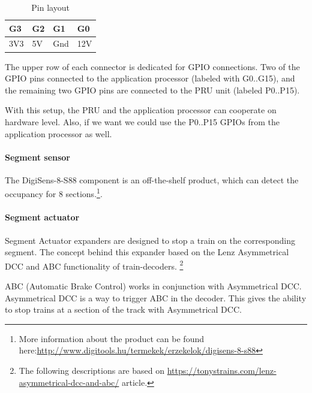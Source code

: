 \begin{table}
	\caption{Pin layout}
	\label{table:expander_pin_layout}
	\begin{center}
		\renewcommand{\arraystretch}{1.8}
		\begin{tabu} to 0.3\textwidth { | X[c] | X[c] | X[c] | X[c] |}
			\hline
			G3 & G2 & G1 & G0 \\
			\hline
			3V3  & 5V  & Gnd  & 12V\\
			\hline
		\end{tabu}
	\end{center}
\end{table} 

The upper row of each connector is dedicated for GPIO connections. Two of the GPIO pins connected to the application processor (labeled with G0..G15), and the remaining two GPIO pins are connected to the PRU unit (labeled P0..P15).

With this setup, the PRU and the application processor can cooperate on hardware level. Also, if we want we could use the P0..P15 GPIOs from the application processor as well.

\paragraph{Segment sensor}\label{paragraph:SegmentSensor}
 The DigiSens-8-S88 component is an off-the-shelf product, which can detect the occupancy for 8 sections.\footnote{More information about the product can be found here:\url{http://www.digitools.hu/termekek/erzekelok/digisens-8-s88}}.

\paragraph{Segment actuator}
Segment Actuator expanders are designed to stop a train on the corresponding segment. The concept behind this expander based on the Lenz Asymmetrical DCC and ABC functionality of train-decoders. \footnote{The following descriptions are based on \url{https://tonystrains.com/lenz-asymmetrical-dcc-and-abc/} article.}

ABC (Automatic Brake Control) works in conjunction with Asymmetrical DCC. Asymmetrical DCC is a way to trigger ABC in the decoder. This gives the ability to stop trains at a section of the track with Asymmetrical DCC.

